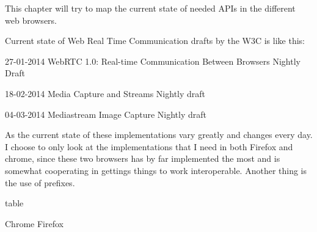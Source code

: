 
This chapter will try to map the current state of needed APIs in the different web browsers.

Current state of Web Real Time Communication drafts by the W3C is like this:

27-01-2014 WebRTC 1.0: Real-time Communication Between Browsers Nightly Draft

18-02-2014 Media Capture and Streams Nightly draft

04-03-2014 Mediastream Image Capture Nightly draft

As the current state of these implementations vary greatly and changes every day. I choose to only look at the implementations that I need in both Firefox and chrome, since these two browsers has by far implemented the most and is somewhat cooperating in gettings things to work interoperable. Another thing is the use of prefixes.


table

Chrome Firefox  
